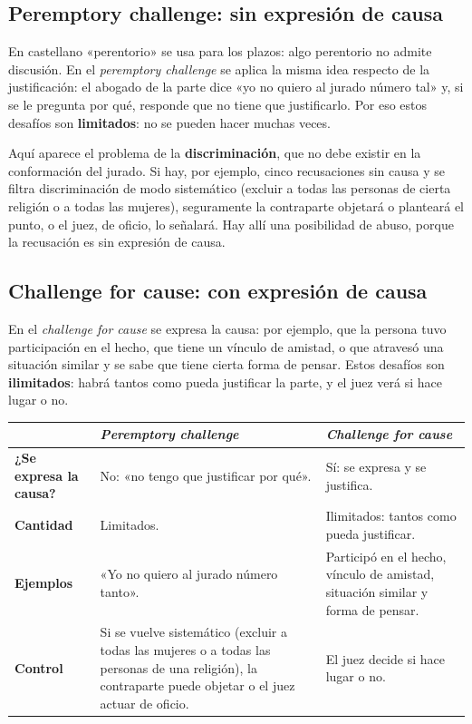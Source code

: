 \documentclass[12pt,oneside]{book}
\begin{document}
\subsection{Peremptory challenge: sin expresión de causa}

En castellano «perentorio» se usa para los plazos: algo perentorio no admite discusión. En el \textit{peremptory challenge} se aplica la misma idea respecto de la justificación: el abogado de la parte dice «yo no quiero al jurado número tal» y, si se le pregunta por qué, responde que no tiene que justificarlo. Por eso estos desafíos son \textbf{limitados}: no se pueden hacer muchas veces.

Aquí aparece el problema de la \textbf{discriminación}, que no debe existir en la conformación del jurado. Si hay, por ejemplo, cinco recusaciones sin causa y se filtra discriminación de modo sistemático (excluir a todas las personas de cierta religión o a todas las mujeres), seguramente la contraparte objetará o planteará el punto, o el juez, de oficio, lo señalará. Hay allí una posibilidad de abuso, porque la recusación es sin expresión de causa.

\subsection{Challenge for cause: con expresión de causa}

En el \textit{challenge for cause} se expresa la causa: por ejemplo, que la persona tuvo participación en el hecho, que tiene un vínculo de amistad, o que atravesó una situación similar y se sabe que tiene cierta forma de pensar. Estos desafíos son \textbf{ilimitados}: habrá tantos como pueda justificar la parte, y el juez verá si hace lugar o no.

\begin{table}[H]
\centering
\begin{tabularx}{\textwidth}{P{3.2cm}LL}
\toprule
 & \textbf{\textit{Peremptory challenge}} & \textbf{\textit{Challenge for cause}} \\
\midrule
\textbf{¿Se expresa la causa?} & No: «no tengo que justificar por qué». & Sí: se expresa y se justifica. \\
\textbf{Cantidad} & Limitados. & Ilimitados: tantos como pueda justificar. \\
\textbf{Ejemplos} & «Yo no quiero al jurado número tanto». & Participó en el hecho, vínculo de amistad, situación similar y forma de pensar. \\
\textbf{Control} & Si se vuelve sistemático (excluir a todas las mujeres o a todas las personas de una religión), la contraparte puede objetar o el juez actuar de oficio. & El juez decide si hace lugar o no. \\
\bottomrule
\end{tabularx}
\end{table}
\end{document}
